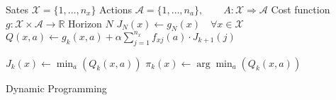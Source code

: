 \documentclass{article}
\begin{document}
\begin{preview}
    \begin{algorithm}[H]
        \begin{algorithmic}
        \Require
        \Statex Sates $\mathcal{X} = \{1, \dots, n_x\}$
        \Statex Actions $\mathcal{A} = \{1, \dots, n_a\},\qquad A: \mathcal{X} \Rightarrow \mathcal{A}$
        \Statex Cost function $g: \mathcal{X} \times \mathcal{A} \rightarrow \mathbb{R}$
        \Statex Horizon $N$
            \State $J_N(x) \gets g_N(x) \quad \forall x \in \mathcal{X}$
                        \State $Q(x, a) \gets g_k(x, a) + \alpha \sum_{j=1}^{n_x} f_{xj}(a) \cdot J_{k+1}(j)$
                    \EndFor

                    \State $J_k (x) \gets \min_a (Q_k(x,a))$
                    \State $\pi_k(x) \gets \arg \min_a (Q_k(x, a))$
                \EndFor
            \EndFor
        \EndProcedure
        \end{algorithmic}
    \caption{Dynamic Programming}
    \label{alg:dynamic-programming}
    \end{algorithm}
\end{preview}
\end{document}
